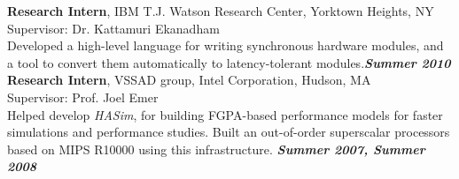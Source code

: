 \documentclass[margin,line]{resume}
\begin{document}
\begin{resume}
    \textbf{Research Intern}, IBM T.J. Watson Research Center, Yorktown Heights, NY\\ 
    Supervisor: Dr. Kattamuri Ekanadham \\
    Developed a high-level language for writing synchronous hardware modules,
    and a tool to convert them automatically to latency-tolerant modules.\hfill \textbf{\textit{Summer 2010}}\\

    \vspace{-7mm}
    \textbf{Research Intern}, VSSAD group, Intel Corporation, Hudson, MA\\
    Supervisor: Prof. Joel Emer \\
    Helped develop \emph{HASim}, for building FGPA-based performance
          models for faster simulations and performance studies. Built an out-of-order superscalar
          processors based on MIPS R10000 using this infrastructure. \hfill \textbf{\textit{Summer 2007, Summer 2008}}\\
    \vspace{-9mm}

\end{resume}
\end{document}
